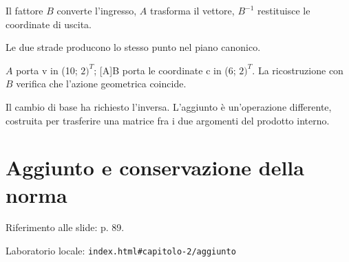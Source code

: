 
Il fattore \(B\) converte l'ingresso, \(A\) trasforma il vettore, \(B^{-1}\) restituisce le coordinate di uscita.\par


\label{c2-cambio-base-example-2-step-6}


Le due strade producono lo stesso punto nel piano canonico.\par



\(A\) porta v in (10; \(2)^{T}\); [A]B porta le coordinate c in (6; \(2)^{T}\). La ricostruzione con \(B\) verifica che l'azione geometrica coincide.\par


Il cambio di base ha richiesto l'inversa. L'aggiunto è un'operazione differente, costruita per trasferire una matrice fra i due argomenti del prodotto interno.\par



\Needspace{.43\textheight}
\section{Aggiunto e conservazione della norma}
\label{c2-aggiunto}

{\sffamily\small\color{Ink!70} Riferimento alle slide: p. 89.\par}

{\sffamily\small\color{Ink!70} Laboratorio locale: \nolinkurl{index.html#capitolo-2/aggiunto}\par}

